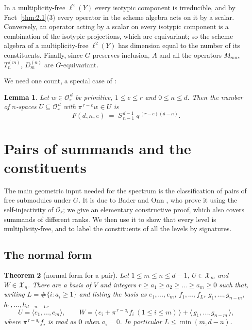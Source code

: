 \documentclass[11pt]{article}
\numberwithin{equation}{section}
\theoremstyle{plain}
\newtheorem{theorem}{Theorem}[section]
\newtheorem{lemma}[theorem]{Lemma}
\theoremstyle{definition}
\begin{document}
In a multiplicity-free $\ell^2(Y)$ every isotypic component is irreducible, and by
Fact~\ref{thm:2.1}(3) every operator in the scheme algebra acts on it by a scalar. Conversely, an
operator acting by a scalar on every isotypic component is a combination of the
isotypic projections, which are equivariant; so the scheme algebra of a
multiplicity-free $\ell^2(Y)$ has dimension equal to the number of its constituents.
Finally, since $G$ preserves inclusion, $A$ and all the operators $M_{mn}$, $T^{(m)}_n$,
$D^{(n)}_m$ are $G$-equivariant.

We need one count, a special case of \cite[Prop. 2.3(2)]{LP25}:

\begin{lemma}\label{thm:2.2}
Let $w\in \mathcal{O}_r^{\,d}$ be primitive, $1\le e\le r$ and $0\le n\le d$.
Then the number of $n$-spaces $U\subseteq \mathcal{O}_r^{\,d}$ with $\pi^{\,r-e}w\in U$ is
\[
F(d,n,e)\;=\;S^{\,d-1}_{\,n-1}\;q^{\,(r-e)(d-n)} .
\]
\end{lemma}

\section{Pairs of summands and the constituents}\label{sec:3}

The main geometric input needed for the spectrum is the classification of pairs of
free submodules under $G$. It is due to Bader and Onn \cite[Cl. 2.2, Lem. 2.3]{BO12}, who prove
it using the self-injectivity of $\mathcal{O}_r$; we give an elementary constructive proof, which
also covers summands of different ranks. We then use it to show that every level is
multiplicity-free, and to label the constituents of all the levels by signatures.

\subsection{The normal form}\label{sec:3.1}

\begin{theorem}[normal form for a pair]\label{thm:3.1}
Let $1\le m\le n\le d-1$, $U\in \mathcal{X}_m$ and
$W\in \mathcal{X}_n$. There are a basis of $V$ and integers $r\ge a_1\ge a_2\ge\dots\ge a_m\ge0$
such that, writing $L=\#\{i:a_i\ge1\}$ and listing the basis as
$e_1,\dots,e_m$, $f_1,\dots,f_L$, $g_1,\dots,g_{n-m}$, $h_1,\dots,h_{d-n-L}$,
\[
U=\langle e_1,\dots,e_m\rangle,\qquad
W=\bigl\langle\,e_i+\pi^{\,r-a_i}f_i\ (1\le i\le m)\,\bigr\rangle
+\langle\,g_1,\dots,g_{n-m}\,\rangle ,
\]
where $\pi^{\,r-a_i}f_i$ is read as $0$ when $a_i=0$. In particular $L\le\min(m,d-n)$.
\end{theorem}
\end{document}
